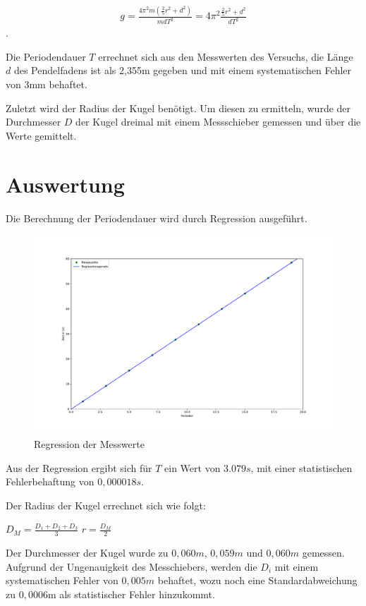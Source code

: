 \begin{align}
	\label{eq:ortsfaktor}
	g = \frac{4 \pi^2 m (\frac{2}{5} r^2 + d^2)}{m d T^2} = 4 \pi^2 \frac{\frac{2}{5} r^2 + d^2}{d T^2}
\end{align} .

Die Periodendauer $T$ errechnet sich aus den Messwerten des Versuchs, die Länge $d$ des Pendelfadens ist als 2,355m gegeben und mit einem systematischen Fehler von 3mm behaftet.

Zuletzt wird der Radius der Kugel benötigt. Um diesen zu ermitteln, wurde der Durchmesser $D$ der Kugel dreimal mit einem Messschieber gemessen und über die Werte gemittelt.

\section{Auswertung}

Die Berechnung der Periodendauer wird durch Regression ausgeführt.

\begin{figure}[h!]
    \centering
    \includegraphics[scale=0.5]{./Pendel/Protokoll/fig/Fadenpendel_Regression.pdf
    }
    \caption{Regression der Messwerte}
    \label{fig:Venturi}
\end{figure}

Aus der Regression ergibt sich für $T$ ein Wert von $3.079s$, mit einer statistischen Fehlerbehaftung von $0,000018s$.

Der Radius der Kugel errechnet sich wie folgt:

$D_M = \frac{D_1 + D_2 + D_3}{3}$
$r = \frac{D_M}{2}$

Der Durchmesser der Kugel wurde zu $0,060m$, $0,059m$ und $0,060m$ gemessen.
Aufgrund der Ungenauigkeit des Messchiebers, werden die $D_i$ mit einem systematischen Fehler von $0,005m$ behaftet, wozu noch eine Standardabweichung zu $0,0006$m als statistischer Fehler hinzukommt.

